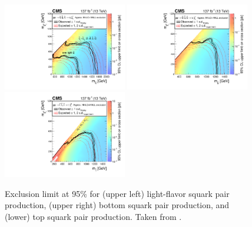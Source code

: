 \begin{figure}[htbp!]
  \centering
    \includegraphics[width=0.48\textwidth]{figures/MT2_2019/Figure_013-a}
    \includegraphics[width=0.48\textwidth]{figures/MT2_2019/Figure_013-b}
    \includegraphics[width=0.48\textwidth]{figures/MT2_2019/Figure_013-c}
    \caption[Exclusion limit at 95\% \CL for (upper left) light-flavor squark pair production, (upper right) bottom squark pair production,
    and (lower) top squark pair production.]{Exclusion limit at 95\% \CL for (upper left) light-flavor squark pair production, (upper right) bottom squark pair production,
    and (lower) top squark pair production. Taken from \cite{MT2_2019}.}
    \label{fig:t2x}
\end{figure}

